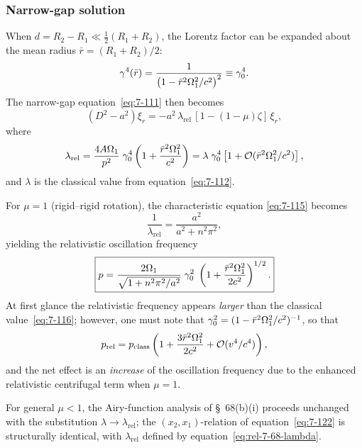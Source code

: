 \subsubsection{Narrow-gap solution}

When $d = R_2 - R_1 \ll \tfrac{1}{2}(R_1+R_2)$, the Lorentz factor
can be expanded about the mean radius $\bar{r} = (R_1+R_2)/2$:
\begin{equation}
\label{eq:rel-7-68-Lf-expand}
\gamma^4(\bar{r})
= \frac{1}{\bigl(1-\bar{r}^2\Omega_1^2/c^2\bigr)^2}
\equiv \gamma_0^4.
\end{equation}
The narrow-gap equation~\eqref{eq:7-111} then becomes
\begin{equation}
\label{eq:rel-7-68-111}
(D^2 - a^2)\xi_r
= -a^2\,\lambda_{\mathrm{rel}}\,[1-(1-\mu)\zeta]\,\xi_r,
\end{equation}
where
\begin{equation}
\label{eq:rel-7-68-lambda}
\lambda_{\mathrm{rel}}
= \frac{4A\Omega_1}{p^2}\;\gamma_0^4
  \left(1 + \frac{\bar{r}^2\Omega_1^2}{c^2}\right)
= \lambda\;\gamma_0^4\left[1 + \mathcal{O}(\bar{r}^2\Omega_1^2/c^2)\right],
\end{equation}
and $\lambda$ is the classical value from equation~\eqref{eq:7-112}.

For $\mu = 1$ (rigid--rigid rotation), the characteristic equation
\eqref{eq:7-115} becomes
\begin{equation}
\label{eq:rel-7-68-115}
\frac{1}{\lambda_{\mathrm{rel}}} = \frac{a^2}{a^2+n^2\pi^2},
\end{equation}
yielding the relativistic oscillation frequency
\begin{equation}
\label{eq:rel-7-68-116}
\boxed{
p = \frac{2\Omega_1}{\sqrt{1 + n^2\pi^2/a^2}}
\;\gamma_0^2
\;\left(1 + \frac{\bar{r}^2\Omega_1^2}{2c^2}\right)^{1/2}.
}
\end{equation}
At first glance the relativistic frequency appears \emph{larger}
than the classical value~\eqref{eq:7-116}; however, one must note that
$\gamma_0^2 = (1-\bar{r}^2\Omega_1^2/c^2)^{-1}$, so that
\begin{equation}
\label{eq:rel-7-68-116-expand}
p_{\mathrm{rel}} = p_{\mathrm{class}}
\left(1 + \frac{3\bar{r}^2\Omega_1^2}{2c^2}
+ \mathcal{O}(v^4/c^4)\right),
\end{equation}
and the net effect is an \emph{increase} of the oscillation frequency
due to the enhanced relativistic centrifugal term when $\mu = 1$.

For general $\mu < 1$, the Airy-function analysis of
\S~68(b)(i) proceeds unchanged with the substitution
$\lambda \to \lambda_{\mathrm{rel}}$; the $(x_2,x_1)$-relation
of equation~\eqref{eq:7-122} is structurally identical, with
$\lambda_{\mathrm{rel}}$ defined by equation~\eqref{eq:rel-7-68-lambda}.

